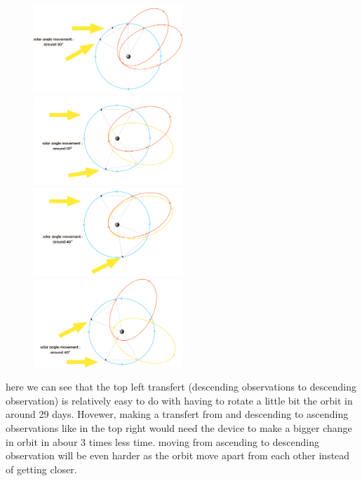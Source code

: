 \documentclass{article} %
\begin{document}
			\begin{figure}[h]
				\includegraphics[width=0.5\textwidth]{images/1in2obs.png}
				\includegraphics[width=0.5\textwidth]{images/odd_to_even.png}
				\includegraphics[width=0.5\textwidth]{images/1in3_obs.png}
				\includegraphics[width=0.5\textwidth]{images/1in3_bad.png}
			\end{figure}
			
			here we can see that the top left transfert (descending observations to descending observation) is relatively easy to do with having to rotate a little bit the orbit in around 29 days. Hovewer, making a transfert from and descending to ascending observations like in the top right  would need the device to make a bigger change in orbit in abour 3 times less time. moving from ascending to descending observation will be even harder as the orbit move apart from each other instead of getting closer.
			
\end{document}
